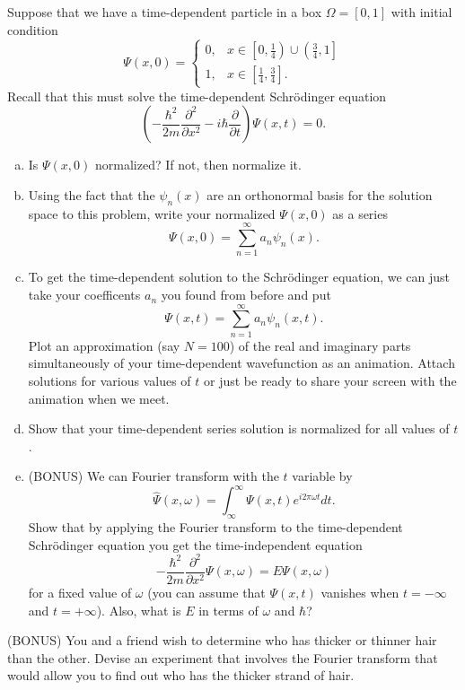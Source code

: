 \documentclass[12pt]{amsbook}
\begin{document}
\newpage
\begin{problem}
Suppose that we have a time-dependent particle in a box $\Omega = [0,1]$ with initial condition
\[
\Psi(x,0) = \begin{cases} 0, & x \in \left[0,\frac{1}{4}\right) \cup \left(\frac{3}{4},1\right]\\
						  1, & x \in \left[\frac{1}{4},\frac{3}{4}\right].
\end{cases}
\]
Recall that this must solve the time-dependent Schr\"odinger equation
\[
\left(-\frac{\hbar^2}{2m}\frac{\partial^2}{\partial x^2} -i\hbar \frac{\partial}{\partial t} \right) \Psi(x,t) = 0.
\]
\begin{enumerate}[(a)]
	\item Is $\Psi(x,0)$ normalized? If not, then normalize it.
	\item Using the fact that the $\psi_n(x)$ are an orthonormal basis for the solution space to this problem, write your normalized $\Psi(x,0)$ as a series
	\[
	\Psi(x,0) = \sum_{n=1}^\infty a_n \psi_n(x).
	\]
	\item To get the time-dependent solution to the Schr\"odinger equation, we can just take your coefficents $a_n$ you found from before and put
\[
\Psi(x,t) = \sum_{n=1}^\infty a_n \psi_n(x,t).
\]
Plot an approximation (say $N=100$) of the real and imaginary parts simultaneously of your time-dependent wavefunction as an animation. Attach solutions for various values of $t$ or just be ready to share your screen with the animation when we meet.
	\item Show that your time-dependent series solution is normalized for all values of $t$.
	\item (BONUS) We can Fourier transform with the $t$ variable by
	\[
	\hat{\Psi}(x,\omega) = \int_{\infty}^\infty \Psi(x,t) e^{i2 \pi \omega t} dt.
	\]
	Show that by applying the Fourier transform to the time-dependent Schr\"odinger equation you get the time-independent equation
	\[
	-\frac{\hbar^2}{2m}\frac{\partial^2}{\partial x^2} \Psi(x,\omega) = E \Psi(x,\omega)
	\]
	for a fixed value of $\omega$ (you can assume that $\Psi(x,t)$ vanishes when $t=-\infty$ and $t=+\infty$). Also, what is $E$ in terms of $\omega$ and $\hbar$?
\end{enumerate}
\end{problem}

\newpage
\begin{problem}
(BONUS) You and a friend wish to determine who has thicker or thinner hair than the other. Devise an experiment that involves the Fourier transform that would allow you to find out who has the thicker strand of hair.
\end{problem}
\end{document}
